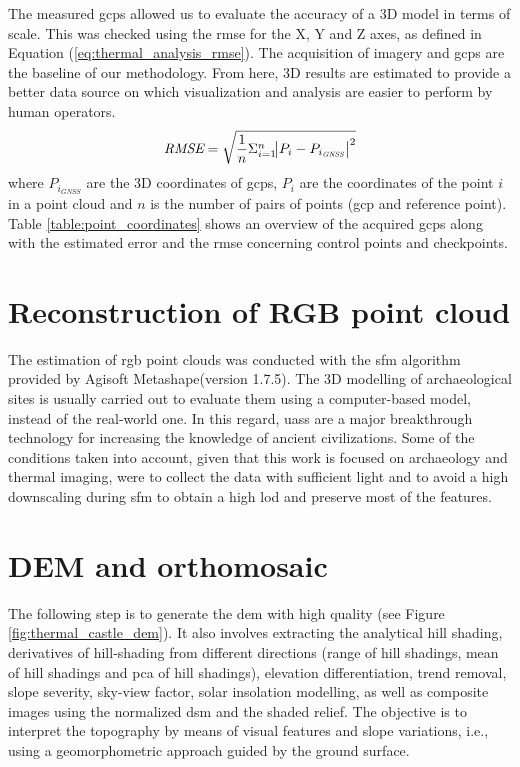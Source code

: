 The measured \acrshort{gcp}s allowed us to evaluate the accuracy of a 3D model in terms of scale. This was checked using the \acrshort{rmse} for the X, Y and Z axes, as defined in Equation (\ref{eq:thermal_analysis_rmse}). The acquisition of imagery and \acrshort{gcp}s are the baseline of our methodology. From here, 3D results are estimated to provide a better data source on which visualization and analysis are easier to perform by human operators.
\begin{equation}
\label{eq:thermal_analysis_rmse}
\textit{RMSE} = \sqrt{\frac{1}{n}\Sigma_{i=1}^{n}{\abs{P_{i} - P_{{i_{\textit{GNSS}}}}}^2}}
\end{equation}
where $P_{i_{\textit{GNSS}}}$ are the 3D coordinates of \acrshort{gcp}s, $P_{i}$ are the coordinates of the point $i$ in a point cloud and $n$ is the number of pairs of points (\acrshort{gcp} and reference point). Table \ref{table:point_coordinates} shows an overview of the acquired \acrshort{gcp}s along with the estimated error and the \acrshort{rmse} concerning control points and checkpoints.

\section{Reconstruction of RGB point cloud}

The estimation of \acrshort{rgb} point clouds was conducted with the \acrshort{sfm} algorithm provided by Agisoft Metashape\textregistered (version 1.7.5). The 3D modelling of archaeological sites is usually carried out to evaluate them using a computer-based model, instead of the real-world one. In this regard, \acrshort{uas}s are a major breakthrough technology for increasing the knowledge of ancient civilizations. Some of the conditions taken into account, given that this work is focused on archaeology and thermal imaging, were to collect the data with sufficient light and to avoid a high downscaling during \acrshort{sfm} to obtain a high \acrshort{lod} and preserve most of the features.

\section{DEM and orthomosaic}

The following step is to generate the \acrshort{dem} with high quality (see Figure \ref{fig:thermal_castle_dem}). It also involves extracting the analytical hill shading, derivatives of hill-shading from different directions (range of hill shadings, mean of hill shadings and \acrshort{pca} of hill shadings), elevation differentiation, trend removal, slope severity, sky-view factor, solar insolation modelling, as well as composite images using the normalized \acrshort{dsm} and the shaded relief. The objective is to interpret the topography by means of visual features and slope variations, i.e., using a geomorphometric approach guided by the ground surface. 


